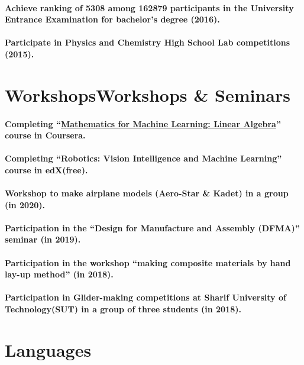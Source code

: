 \documentclass[a4paper]{article}
\begin{document}
        \paragraph{Achieve ranking of 5308 among 162879 participants in the University Entrance Examination for bachelor's degree (2016).}
        \paragraph{Participate in Physics and Chemistry High School Lab competitions (2015).}
    \section{WorkshopsWorkshops \& Seminars}
        \paragraph{Completing “\href{https://coursera.org/share/727feebde54da2fa7042a84ce71c53e7}{Mathematics for Machine Learning: Linear Algebra}” course in Coursera.}
        \paragraph{Completing “Robotics: Vision Intelligence and Machine Learning” course in edX(free).}
        \paragraph{Workshop to make airplane models (Aero-Star \& Kadet) in a group (in 2020).}
        \paragraph{Participation in the “Design for Manufacture and Assembly (DFMA)” seminar (in 2019).}
        \paragraph{Participation in the workshop “making composite materials by hand lay-up method” (in 2018).}
        \paragraph{Participation in Glider-making competitions at Sharif University of Technology(SUT) in a group of three students (in 2018).}
    \section{Languages}
\end{document}
